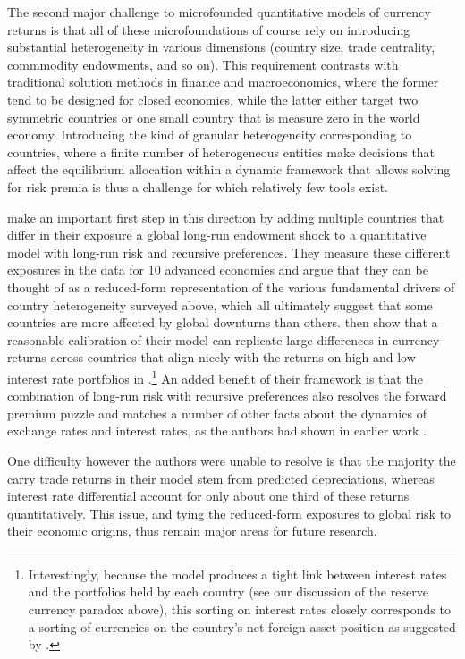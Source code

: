 \documentclass{ar-1col}
\begin{document}
The second major challenge to microfounded quantitative models of currency returns is that all of these microfoundations of course rely on introducing substantial heterogeneity in various dimensions (country size, trade centrality, commmodity endowments, and so on). This requirement contrasts with traditional solution methods in finance and macroeconomics, where the former tend to be designed for closed economies, while the latter either target two symmetric countries or one small country that is measure zero in the world economy. Introducing the kind of granular heterogeneity corresponding to countries, where a finite number of heterogeneous entities make decisions that affect the equilibrium allocation within a dynamic framework that allows solving for risk premia is thus a challenge for which relatively few tools exist. 

\citet{ColacitoCroceHoHoward2018} make an important first step in this direction by adding multiple countries that differ in their exposure a global long-run endowment shock to a quantitative model with long-run risk and recursive preferences. They measure these different exposures in the data for 10 advanced economies and argue that they can be thought of as a reduced-form representation of the various fundamental drivers of country heterogeneity surveyed above, which all ultimately suggest that some countries are more affected by global downturns than others. \citet{ColacitoCroceHoHoward2018} then show that a reasonable calibration of their model can replicate large differences in currency returns across countries that align nicely with the returns on high and low interest rate portfolios in \cite{LustigRoussanovVerdelhan2011}.\footnote{ Interestingly, because the model produces a tight link between interest rates and the portfolios held by each country (see our discussion of the reserve currency paradox above), this sorting on interest rates closely corresponds to a sorting of currencies on the country's net foreign asset position as suggested by \citet{DellaCorteetal2016}.} 
An added benefit of their framework is that the combination of long-run risk with recursive preferences also resolves the forward premium puzzle and matches a number of other facts about the dynamics of exchange rates and interest rates, as the authors had shown in earlier work \citep{ColacitoCroce2011}. 

One difficulty however the authors were unable to resolve is that the majority the carry trade returns in their model stem from predicted depreciations, whereas interest rate differential account for only about one third of these returns quantitatively. This issue, and tying the reduced-form exposures to global risk to their economic origins, thus remain major areas for future research.
\end{document}
